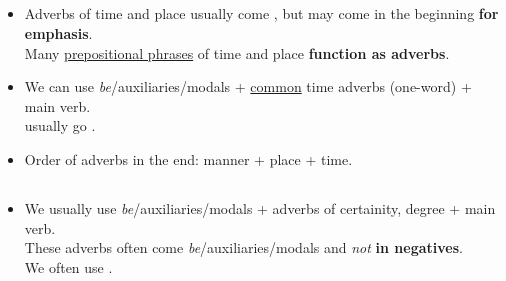 \subsection{}
\begin{itemize}
    \item[\doot] Adverbs of time and place usually come , but may come in the beginning \textbf{for emphasis}.\\
    Many \underline{prepositional phrases} of time and place \textbf{function as adverbs}.
    \item[\doot] We can use \textit{be}/auxiliaries/modals + \underline{common} time adverbs (one-word) + main verb.\\
     usually go .
    \item[\aast] Order of adverbs in the end: manner + place + time.
\end{itemize}

\subsection{}
\begin{itemize}
    \item[\doot] We usually use \textit{be}/auxiliaries/modals + adverbs of certainity, degree + main verb.\\
    These adverbs often come  \textit{be}/auxiliaries/modals and \textit{not} \textbf{in negatives}.\\
    We often use  .
\end{itemize}